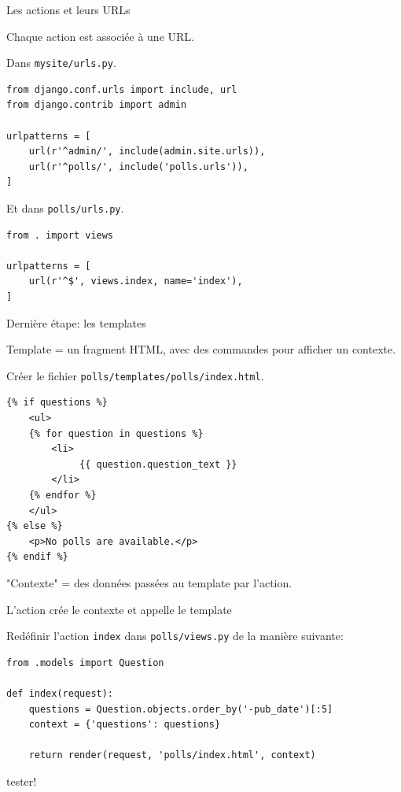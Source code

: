 \begin{frame}[fragile]{Les actions et leurs URLs}


\alert{Chaque action est associée à une URL}. 

\vfill

Dans \texttt{mysite/urls.py}.

\begin{verbatim}
from django.conf.urls import include, url
from django.contrib import admin

urlpatterns = [
    url(r'^admin/', include(admin.site.urls)),
    url(r'^polls/', include('polls.urls')),
]
\end{verbatim}

\vfill

Et dans \texttt{polls/urls.py}.

\begin{verbatim}
from . import views

urlpatterns = [
    url(r'^$', views.index, name='index'),
]
\end{verbatim}

\end{frame}


\begin{frame}[fragile]{Dernière étape: les templates}

Template = un fragment HTML, avec des commandes pour afficher un 
\alert{contexte.}

\vfill

Créer le fichier \texttt{polls/templates/polls/index.html}.

\begin{verbatim}
{% if questions %}
    <ul>
    {% for question in questions %}
        <li>
             {{ question.question_text }}
        </li>
    {% endfor %}
    </ul>
{% else %}
    <p>No polls are available.</p>
{% endif %}
\end{verbatim}

\vfill

"Contexte" = des données passées au template par l'action.
\end{frame}

\begin{frame}[fragile]{L'action crée le contexte et appelle le template}

Redéfinir l'action \texttt{index} dans \texttt{polls/views.py} de la manière suivante:

\begin{verbatim}
from .models import Question

def index(request):
    questions = Question.objects.order_by('-pub_date')[:5]
    context = {'questions': questions}
    
    return render(request, 'polls/index.html', context)
\end{verbatim}

\vfill

tester!

\end{frame}

